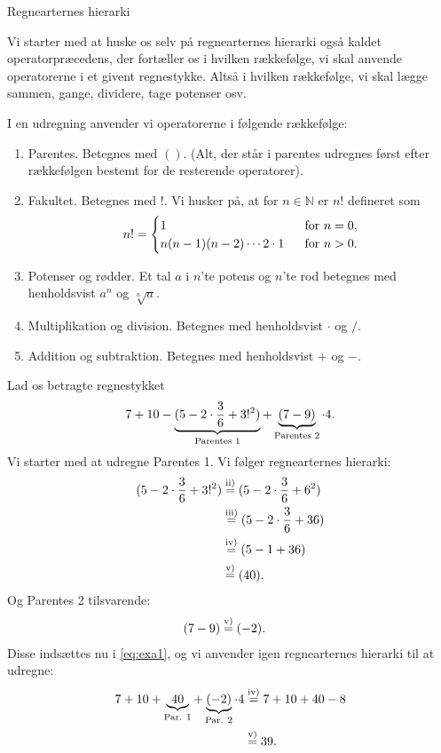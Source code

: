 

\begin{center}
\Huge
Regnearternes hierarki
\end{center}

Vi starter med at huske os selv på regnearternes hierarki også kaldet operatorpræcedens, der fortæller os i hvilken rækkefølge, vi skal anvende operatorerne i et givent regnestykke. Altså i hvilken rækkefølge, vi skal lægge sammen, gange, dividere, tage potenser osv. 
\begin{defn}
I en udregning anvender vi operatorerne i følgende rækkefølge:
\begin{enumerate}[label=\roman*)]
\item Parentes. Betegnes med $()$. (Alt, der står i parentes udregnes først efter rækkefølgen bestemt for de resterende operatorer).
\item Fakultet. Betegnes med $!$. Vi husker på, at for $n\in \mathbb{N}$ er $n!$ defineret som 
\begin{align*}
n! = \begin{cases}
1 \ &\textnormal{ for }n=0,\\
n(n-1)(n-2)\cdots 2\cdot 1 \ &\textnormal{ for }n>0.
\end{cases}
\end{align*}
\item Potenser og rødder. Et tal $a$ i $n$'te potens og $n$'te rod betegnes med henholdsvist $a^n$ og $\sqrt[n]{a}$.
\item Multiplikation og division. Betegnes med henholdsvist $\cdot$ og $/$.
\item Addition og subtraktion. Betegnes med henholdsvist $+$ og $-$.
\end{enumerate}
\end{defn} 
\begin{exa}
Lad os betragte regnestykket
\begin{align}\label{eq:exa1}
7+10-\underbrace{(5-2\cdot \frac{3}{6}+3!^2)}_{\textnormal{Parentes 1}}+\underbrace{(7-9)}_{\textnormal{Parentes 2}}\cdot 4.
\end{align}
Vi starter med at udregne Parentes 1. Vi følger regnearternes hierarki:
\begin{align*}
(5-2\cdot \frac{3}{6}+3!^2) &\overset{\textnormal{ii)}}{=} (5-2\cdot \frac{3}{6}+6^2)\\
							&\overset{\textnormal{iii)}}{=} (5-2\cdot \frac{3}{6}+36)\\
							&\overset{\textnormal{iv)}}{=} (5-1+36)\\
							&\overset{\textnormal{v)}}{=} (40).
\end{align*}
Og Parentes 2 tilsvarende:
\begin{align*}
(7-9) &\overset{\textnormal{v)}}{=} (-2).
\end{align*}
Disse indsættes nu i \eqref{eq:exa1}, og vi anvender igen regnearternes hierarki til at udregne:
\begin{align*}
7+10+\underbrace{40}_{\textnormal{Par. 1}} + \underbrace{(-2)}_{\textnormal{Par. 2}}\cdot 4 &\overset{\textnormal{iv)}}{=} 7+10+40 -8 \\
&\overset{\textnormal{v)}}{=} 39.
\end{align*}
\end{exa}
